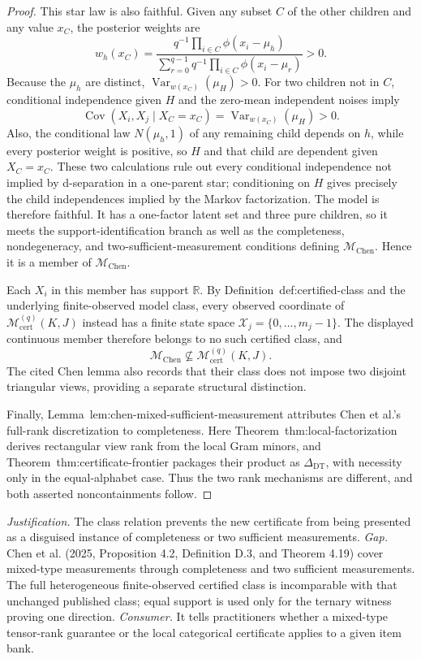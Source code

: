 \documentclass{article}
\begin{document}
\begin{proof}
This star law is also faithful.  Given any subset \(C\) of the other children and any value \(x_C\), the posterior weights are
\[
 w_h(x_C)
 =\frac{q^{-1}\prod_{i\in C}\phi(x_i-\mu_h)}
        {\sum_{r=0}^{q-1}q^{-1}\prod_{i\in C}\phi(x_i-\mu_r)}>0.
\]
Because the \(\mu_h\) are distinct, \(\operatorname{Var}_{w(x_C)}(\mu_H)>0\).  For two children not in \(C\), conditional independence given \(H\) and the zero-mean independent noises imply
\[
 \operatorname{Cov}(X_i,X_j\mid X_C=x_C)
 =\operatorname{Var}_{w(x_C)}(\mu_H)>0.
\]
Also, the conditional law \(N(\mu_h,1)\) of any remaining child depends on \(h\), while every posterior weight is positive, so \(H\) and that child are dependent given \(X_C=x_C\).  These two calculations rule out every conditional independence not implied by d-separation in a one-parent star; conditioning on \(H\) gives precisely the child independences implied by the Markov factorization.  The model is therefore faithful.  It has a one-factor latent set and three pure children, so it meets the support-identification branch as well as the completeness, nondegeneracy, and two-sufficient-measurement conditions defining \(\mathcal M_{\mathrm{Chen}}\).  Hence it is a member of \(\mathcal M_{\mathrm{Chen}}\).

Each \(X_i\) in this member has support \(\mathbb R\).  By Definition~\textnormal{def:certified-class} and the underlying finite-observed model class, every observed coordinate of \(\mathcal M_{\mathrm{cert}}^{(q)}(K,J)\) instead has a finite state space \(\mathcal X_j=\{0,\ldots,m_j-1\}\).  The displayed continuous member therefore belongs to no such certified class, and
\[
 \mathcal M_{\mathrm{Chen}}\not\subseteq
 \mathcal M_{\mathrm{cert}}^{(q)}(K,J).
\]
The cited Chen lemma also records that their class does not impose two disjoint triangular views, providing a separate structural distinction.

Finally, Lemma~\textnormal{lem:chen-mixed-sufficient-measurement} attributes Chen et al.'s full-rank discretization to completeness.  Here Theorem~\textnormal{thm:local-factorization} derives rectangular view rank from the local Gram minors, and Theorem~\textnormal{thm:certificate-frontier} packages their product as \(\Delta_{\mathrm{DT}}\), with necessity only in the equal-alphabet case.  Thus the two rank mechanisms are different, and both asserted noncontainments follow.
\end{proof}
\par\smallskip\noindent \textit{Justification.} The class relation prevents the new certificate from being presented as a disguised instance of completeness or two sufficient measurements. \textit{Gap.} Chen et al. (2025, Proposition 4.2, Definition D.3, and Theorem 4.19) cover mixed-type measurements through completeness and two sufficient measurements.  The full heterogeneous finite-observed certified class is incomparable with that unchanged published class; equal support is used only for the ternary witness proving one direction. \textit{Consumer.} It tells practitioners whether a mixed-type tensor-rank guarantee or the local categorical certificate applies to a given item bank.
\end{document}
